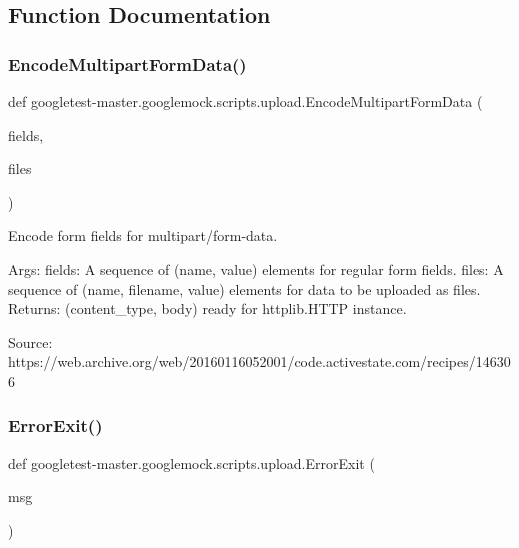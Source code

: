 \subsection{Function Documentation}
\mbox{\label{namespacegoogletest-master_1_1googlemock_1_1scripts_1_1upload_a26e47310825b8e956fdc8dbbd9d5a7e9}} 
\subsubsection{\texorpdfstring{EncodeMultipartFormData()}{EncodeMultipartFormData()}}
{\footnotesize\ttfamily def googletest-\/master.\+googlemock.\+scripts.\+upload.\+Encode\+Multipart\+Form\+Data (\begin{DoxyParamCaption}\item[{}]{fields,  }\item[{}]{files }\end{DoxyParamCaption})}

\begin{DoxyVerb}Encode form fields for multipart/form-data.

Args:
  fields: A sequence of (name, value) elements for regular form fields.
  files: A sequence of (name, filename, value) elements for data to be
         uploaded as files.
Returns:
  (content_type, body) ready for httplib.HTTP instance.

Source:
  https://web.archive.org/web/20160116052001/code.activestate.com/recipes/146306
\end{DoxyVerb}
 \mbox{\label{namespacegoogletest-master_1_1googlemock_1_1scripts_1_1upload_a7c60b0ba49465c87fe470bfe18c56845}} 
\subsubsection{\texorpdfstring{ErrorExit()}{ErrorExit()}}
{\footnotesize\ttfamily def googletest-\/master.\+googlemock.\+scripts.\+upload.\+Error\+Exit (\begin{DoxyParamCaption}\item[{}]{msg }\end{DoxyParamCaption})}


